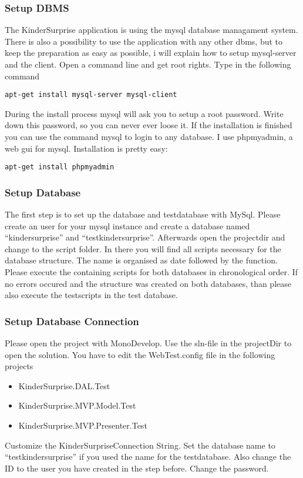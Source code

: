 \documentclass{article}
\begin{document}
\subsubsection{Setup DBMS}
The KinderSurprise application is using the mysql database managament system.
There is also a possibility to use the application with any other dbms, but to
keep the preparation as easy as possible, i will explain how to setup
mysql-server and the client.
Open a command line and get root rights.
Type in the following command 
\begin{verbatim}
apt-get install mysql-server mysql-client
\end{verbatim} 
During the install process mysql will ask you to setup a root password.
Write down this password, so you can never ever loose it.
If the installation is finished you can use the command mysql to login to any
database.
I use phpmyadmin, a web gui for mysql. Installation is pretty easy:
\begin{verbatim}
apt-get install phpmyadmin
\end{verbatim}


\subsubsection{Setup Database}
The first step is to set up the database and testdatabase with MySql.
Please create an user for your mysql instance and create a database named
``kindersurprise'' and ``testkindersurprise''.
Afterwards open the projectdir and change to the script folder.
In there you will find all scripts necessary for the database structure. The
name is organised as date followed by the function.
Please execute the containing scripts for both databases in chronological order.
If no errors occured and the structure was created on both databases, than
please also execute the testscripts in the test database.

\subsubsection{Setup Database Connection}
Please open the project with MonoDevelop. Use the sln-file in the projectDir to
open the solution.
You have to edit the WebTest.config file in the following projects
\begin{itemize}
  \item KinderSurprise.DAL.Test
  \item KinderSurprise.MVP.Model.Test
  \item KinderSurprise.MVP.Presenter.Test
\end{itemize}
Customize the KinderSurpriseConnection String. Set the database name to
``testkindersurprise'' if you used the name for the testdatabase. Also change
the ID to the user you have created in the step before. Change the password.\\
\end{document}
